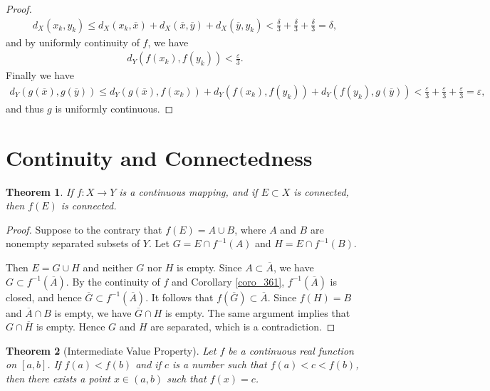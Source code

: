 \documentclass[10pt]{book}
\newtheorem{theorem}{Theorem}[chapter]
\theoremstyle{definition}
\numberwithin{equation}{chapter}
\begin{document}
\begin{proof}
\begin{align*}
    d_X(x_k, y_k) \leq d_X(x_k,\overline{x}) + d_X(\overline{x},\overline{y}) + d_X(\overline{y}, y_k) < \frac{\delta}{3} + \frac{\delta}{3} + \frac{\delta}{3} = \delta,
\end{align*}
and by uniformly continuity of $f$, we have
\begin{align*}
    d_Y(f(x_k), f(y_k)) < \frac{\varepsilon}{3}.
\end{align*}
Finally we have
\begin{align*}
    d_Y(g(\overline{x}),g(\overline{y})) \leq d_Y(g(\overline{x}),f(x_k)) + d_Y(f(x_k), f(y_k)) + d_Y(f(y_k), g(\overline{y})) < \frac{\varepsilon}{3} + \frac{\varepsilon}{3} + \frac{\varepsilon}{3} = \varepsilon,
\end{align*}
and thus $g$ is uniformly continuous.
\end{proof}
 

\medskip


\section{Continuity and Connectedness}

\begin{theorem}\label{th_315}
If $f: X \to Y$ is a continuous mapping, and if $E \subset X$ is connected, then $f(E)$ is connected.
\end{theorem}
\begin{proof}
Suppose to the contrary that $f(E) = A \cup B$, where $A$ and $B$ are nonempty separated subsets of $Y$. Let $G = E \cap f^{-1}(A)$ and $H = E \cap f^{-1}(B)$.

Then $E = G \cup H$ and neither $G$ nor $H$ is empty. Since $A \subset \overline{A}$, we have $G \subset f^{-1}(\overline{A})$. By the continuity of $f$ and Corollary \ref{coro_361}, $f^{-1}(\overline{A})$ is closed, and hence $\overline{G} \subset f^{-1}(\overline{A})$. It follows that $f(\overline{G}) \subset \overline{A}$. Since $f(H) = B$ and $\overline{A} \cap B$ is empty, we have $\overline{G} \cap H$ is empty. The same argument implies that $G \cap \overline{H}$ is empty. Hence $G$ and $H$ are separated, which is a contradiction.
\end{proof}

\medskip

\begin{theorem}[Intermediate Value Property]\label{th_316}
Let $f$ be a continuous real function on $[a,b]$. If $f(a) < f(b)$ and if $c$ is a number such that $f(a) < c < f(b)$, then there exists a point $x \in (a,b)$ such that $f(x) = c$. 
\end{theorem}
\end{document}
